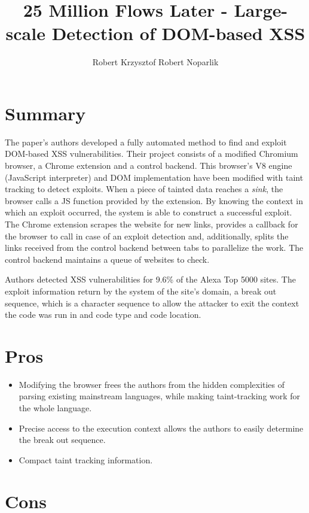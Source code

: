 \documentclass{article}
\title{25 Million Flows Later - Large-scale Detection of
DOM-based XSS}
\author{Robert Krzysztof Robert Noparlik}
\begin{document}
\maketitle

\section{Summary}

The paper's authors developed a fully automated method to find and exploit DOM-based XSS vulnerabilities.
Their project consists of a modified Chromium browser, a Chrome extension and a control backend. This browser's V8 engine (JavaScript interpreter) and DOM implementation have been modified with taint tracking to detect exploits. When a piece of tainted data reaches a \textit{sink}, the browser calls a JS function provided by the extension. By knowing the context in which an exploit occurred, the system is able to construct a successful exploit. The Chrome extension scrapes the website for new links, provides a callback for the browser to call in case of an exploit detection and, additionally, splits the links received from the control backend between tabs to parallelize the work. The control backend maintains a queue of websites to check.

Authors detected XSS vulnerabilities for 9.6\% of the Alexa Top 5000 sites. The exploit information return by the system of the site's domain, a break out sequence, which is a character sequence to allow the attacker to exit the context the code was run in and code type and code location.


\section{Pros}

\begin{itemize}
	\item Modifying the browser frees the authors from the hidden complexities of parsing existing mainstream languages, while making taint-tracking work for the whole language.

	\item Precise access to the execution context allows the authors to easily determine the break out sequence.
	
	\item Compact taint tracking information.
\end{itemize}

\section{Cons}
\end{document}
